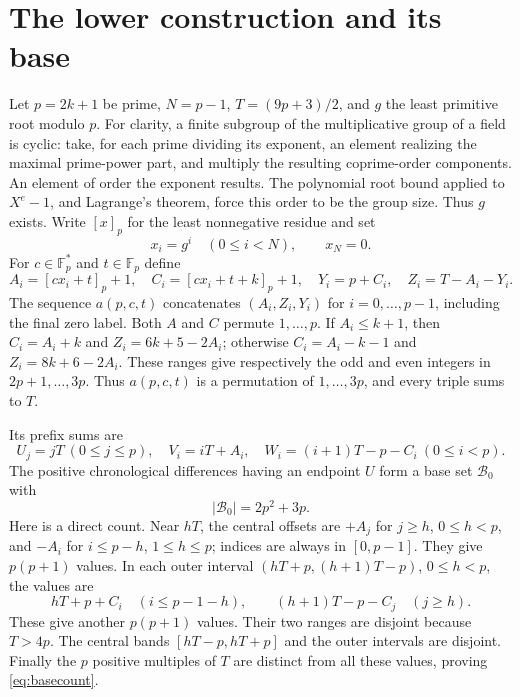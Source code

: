 \documentclass[10pt]{amsart}
\theoremstyle{remark}
\newcommand{\Fp}{\mathbb F_p}
\newcommand{\Bset}{\mathcal B}
\begin{document}
\section{The lower construction and its base}\label{sec:construction}
Let $p=2k+1$ be prime, $N=p-1$, $T=(9p+3)/2$, and $g$ the least
primitive root modulo $p$. For clarity, a finite subgroup of the
multiplicative group of a field is cyclic: take, for each prime
dividing its exponent, an element realizing the maximal prime-power
part, and multiply the resulting coprime-order components. An element
of order the exponent results. The polynomial root bound applied to
$X^e-1$, and Lagrange's theorem, force this order to be the group size.
Thus $g$ exists. Write $[x]_p$ for the least nonnegative residue and set
\begin{equation}\label{eq:labels}
 x_i=g^i\quad(0\le i<N),\qquad x_N=0.
\end{equation}
For $c\in\Fp^*$ and $t\in\Fp$ define
\begin{equation}\label{eq:construction}
 A_i=[cx_i+t]_p+1,\quad C_i=[cx_i+t+k]_p+1,\quad
 Y_i=p+C_i,\quad Z_i=T-A_i-Y_i.
\end{equation}
The sequence $a(p,c,t)$ concatenates $(A_i,Z_i,Y_i)$ for
$i=0,\ldots,p-1$, including the final zero label.
Both $A$ and $C$ permute $1,\ldots,p$. If $A_i\le k+1$, then
$C_i=A_i+k$ and $Z_i=6k+5-2A_i$; otherwise
$C_i=A_i-k-1$ and $Z_i=8k+6-2A_i$. These ranges give respectively
the odd and even integers in $2p+1,\ldots,3p$. Thus $a(p,c,t)$ is a
permutation of $1,\ldots,3p$, and every triple sums to $T$.

Its prefix sums are
\[
 U_j=jT\ (0\le j\le p),\quad V_i=iT+A_i,\quad
 W_i=(i+1)T-p-C_i\ (0\le i<p).
\]
The positive chronological differences having an endpoint $U$ form
a base set $\Bset_0$ with
\begin{equation}\label{eq:basecount}
 |\Bset_0|=2p^2+3p.
\end{equation}
Here is a direct count. Near $hT$, the central offsets are $+A_j$
for $j\ge h$, $0\le h<p$, and $-A_i$ for $i\le p-h$, $1\le h\le p$;
indices are always in $[0,p-1]$. They give $p(p+1)$ values.
In each outer interval $(hT+p,(h+1)T-p)$, $0\le h<p$, the values are
\begin{equation}\label{eq:basetails}
 hT+p+C_i\quad(i\le p-1-h),\qquad
 (h+1)T-p-C_j\quad(j\ge h).
\end{equation}
These give another $p(p+1)$ values. Their two ranges are disjoint
because $T>4p$. The central bands $[hT-p,hT+p]$ and the outer
intervals are disjoint. Finally the $p$ positive multiples of $T$
are distinct from all these values, proving \eqref{eq:basecount}.
\end{document}
